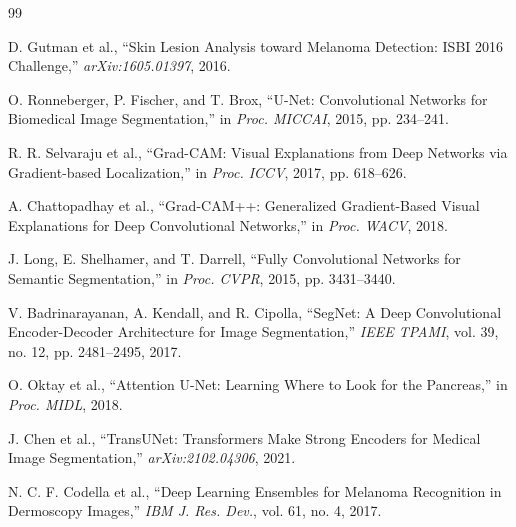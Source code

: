 \documentclass[10pt,journal,compsoc]{IEEEtran}
\begin{document}
\begin{thebibliography}{99}

D. Gutman et al., ``Skin Lesion Analysis toward Melanoma Detection: ISBI 2016 Challenge,'' \textit{arXiv:1605.01397}, 2016.

O. Ronneberger, P. Fischer, and T. Brox, ``U-Net: Convolutional Networks for Biomedical Image Segmentation,'' in \textit{Proc. MICCAI}, 2015, pp. 234--241.

R. R. Selvaraju et al., ``Grad-CAM: Visual Explanations from Deep Networks via Gradient-based Localization,'' in \textit{Proc. ICCV}, 2017, pp. 618--626.

A. Chattopadhay et al., ``Grad-CAM++: Generalized Gradient-Based Visual Explanations for Deep Convolutional Networks,'' in \textit{Proc. WACV}, 2018.

J. Long, E. Shelhamer, and T. Darrell, ``Fully Convolutional Networks for Semantic Segmentation,'' in \textit{Proc. CVPR}, 2015, pp. 3431--3440.

V. Badrinarayanan, A. Kendall, and R. Cipolla, ``SegNet: A Deep Convolutional Encoder-Decoder Architecture for Image Segmentation,'' \textit{IEEE TPAMI}, vol. 39, no. 12, pp. 2481--2495, 2017.

O. Oktay et al., ``Attention U-Net: Learning Where to Look for the Pancreas,'' in \textit{Proc. MIDL}, 2018.

J. Chen et al., ``TransUNet: Transformers Make Strong Encoders for Medical Image Segmentation,'' \textit{arXiv:2102.04306}, 2021.

N. C. F. Codella et al., ``Deep Learning Ensembles for Melanoma Recognition in Dermoscopy Images,'' \textit{IBM J. Res. Dev.}, vol. 61, no. 4, 2017.

\end{thebibliography}
\end{document}
